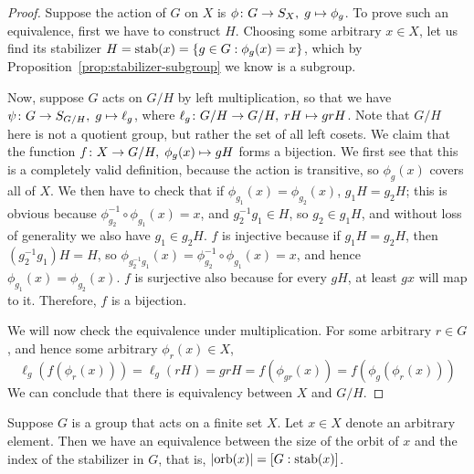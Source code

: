 \begin{proof}
    Suppose the action of \(G\) on \(X\)
    is \(\phi\colon G\to S_X,\;g\mapsto\phi_g\).
    To prove such an equivalence,
    first we have to construct \(H\).
    Choosing some arbitrary \(x \in X\),
    let us find its stabilizer \(H = \operatorname{stab}(x) = \{g \in G : \phi_g(x) = x\}\),
    which by Proposition~\ref{prop:stabilizer-subgroup} we know is a subgroup.

    Now, suppose \(G\) acts on \(G/H\) by left multiplication,
    so that we have \(\psi\colon G\to S_{G/H},\;g\mapsto\ell_g\),
    where \(\ell_g\colon G/H\to G/H,\;rH\mapsto grH\).
    Note that \(G/H\) here is not a quotient group,
    but rather the set of all left cosets.
    We claim that the function \(f\colon X\to G/H,\;\phi_g(x)\mapsto gH\)
    forms a bijection.
    We first see that this is a completely valid definition,
    because the action is transitive, so \(\phi_g(x)\) covers all of \(X\).
    We then have to check that if \(\phi_{g_1}(x) = \phi_{g_2}(x)\),
    \(g_1H = g_2H\);
    this is obvious because \(\phi_{g_2}^{-1}\circ\phi_{g_1}(x) = x\),
    and \(g_2^{-1} g_1 \in H\), so \(g_2 \in g_1 H\),
    and without loss of generality we also have \(g_1 \in g_2 H\).
    \(f\) is injective because if \(g_1 H = g_2 H\),
    then \((g_2^{-1}g_1)H = H\),
    so \(\phi_{g_2^{-1}g_1}(x) = \phi_{g_2}^{-1}\circ\phi_{g_1}(x) = x\),
    and hence \(\phi_{g_1}(x) = \phi_{g_2}(x)\).
    \(f\) is surjective also because for every \(gH\),
    at least \(gx\) will map to it.
    Therefore, \(f\) is a bijection.

    We will now check the equivalence under multiplication.
    For some arbitrary \(r \in G\),
    and hence some arbitrary \(\phi_r(x) \in X\),
    \begin{equation*}
        \ell_g(f(\phi_r(x))) = \ell_g(rH) = grH
        = f(\phi_{gr}(x)) = f(\phi_g(\phi_r(x)))
    \end{equation*}
    We can conclude that there is equivalency between \(X\) and \(G/H\).
\end{proof}
\begin{corollary}\label{cor:orbit-stabilizer}
    Suppose \(G\) is a group that acts on a finite set \(X\).
    Let \(x \in X\) denote an arbitrary element.
    Then we have an equivalence between the size of the orbit of \(x\)
    and the index of the stabilizer in \(G\),
    that is, \(\abs{\operatorname{orb}(x)} = [G:\operatorname{stab}(x)]\).
\end{corollary}
